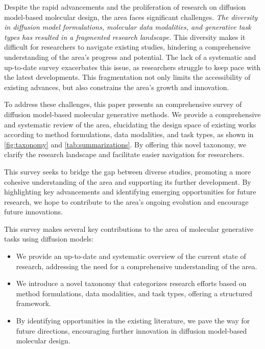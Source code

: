 Despite the rapid advancements and the proliferation of research on diffusion model-based molecular design, the area faces significant challenges. \textit{The diversity in diffusion model formulations, molecular data modalities, and generative task types has resulted in a fragmented research landscape.} This diversity makes it difficult for researchers to navigate existing studies, hindering a comprehensive understanding of the area's progress and potential. The lack of a systematic and up-to-date survey exacerbates this issue, as researchers struggle to keep pace with the latest developments. This fragmentation not only limits the accessibility of existing advances, but also constrains the area's growth and innovation.

To address these challenges, this paper presents an comprehensive survey of diffusion model-based molecular generative methods. We provide a comprehensive and systematic review of the area, elucidating the design space of existing works
according to method formulations, data modalities, and task types, as shown in \cref{fig:taxonomy} and \cref{tab:summarizations}. By offering this novel taxonomy, we clarify the research landscape and facilitate easier navigation for researchers. 

This survey seeks to bridge the gap between diverse studies, promoting a more cohesive understanding of the area and supporting its further development. By highlighting key advancements and identifying emerging opportunities for future research, we hope to contribute to the area's ongoing evolution and encourage future innovations.

This survey makes several key contributions to the area of molecular generative tasks using diffusion models:
\begin{itemize}[leftmargin=*]
    \item We provide an up-to-date and systematic overview of the current state of research, addressing the need for a comprehensive understanding of the area.
    \item We introduce a novel taxonomy that categorizes research efforts based on method formulations, data modalities, and task types, offering a structured framework.
    \item By identifying opportunities in the existing literature, we pave the way for future directions, encouraging further innovation in diffusion model-based molecular design.
\end{itemize}